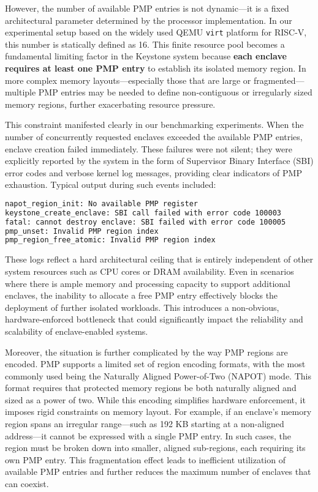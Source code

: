 However, the number of available PMP entries is not dynamic—it is a fixed architectural parameter determined by the processor implementation. In our experimental setup based on the widely used QEMU \texttt{virt} platform for RISC-V, this number is statically defined as 16. This finite resource pool becomes a fundamental limiting factor in the Keystone system because \textbf{each enclave requires at least one PMP entry} to establish its isolated memory region. In more complex memory layouts—especially those that are large or fragmented—multiple PMP entries may be needed to define non-contiguous or irregularly sized memory regions, further exacerbating resource pressure.

This constraint manifested clearly in our benchmarking experiments. When the number of concurrently requested enclaves exceeded the available PMP entries, enclave creation failed immediately. These failures were not silent; they were explicitly reported by the system in the form of Supervisor Binary Interface (SBI) error codes and verbose kernel log messages, providing clear indicators of PMP exhaustion. Typical output during such events included:

\begin{lstlisting}[language=bash,caption={Error messages during enclave creation and destruction}]
napot_region_init: No available PMP register
keystone_create_enclave: SBI call failed with error code 100003
fatal: cannot destroy enclave: SBI failed with error code 100005
pmp_unset: Invalid PMP region index
pmp_region_free_atomic: Invalid PMP region index
\end{lstlisting}

These logs reflect a hard architectural ceiling that is entirely independent of other system resources such as CPU cores or DRAM availability. Even in scenarios where there is ample memory and processing capacity to support additional enclaves, the inability to allocate a free PMP entry effectively blocks the deployment of further isolated workloads. This introduces a non-obvious, hardware-enforced bottleneck that could significantly impact the reliability and scalability of enclave-enabled systems.

Moreover, the situation is further complicated by the way PMP regions are encoded. PMP supports a limited set of region encoding formats, with the most commonly used being the Naturally Aligned Power-of-Two (NAPOT) mode. This format requires that protected memory regions be both naturally aligned and sized as a power of two. While this encoding simplifies hardware enforcement, it imposes rigid constraints on memory layout. For example, if an enclave's memory region spans an irregular range—such as 192 KB starting at a non-aligned address—it cannot be expressed with a single PMP entry. In such cases, the region must be broken down into smaller, aligned sub-regions, each requiring its own PMP entry. This fragmentation effect leads to inefficient utilization of available PMP entries and further reduces the maximum number of enclaves that can coexist.

